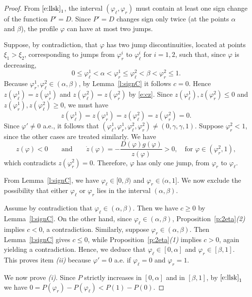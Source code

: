 \documentclass[11pt,a4paper]{article}
\renewcommand{\phi}{\varphi}
\begin{document}
\begin{proof}
From $\eqref{e:llsk}_1$, the interval $(\phi_\ell, \phi_r)$ must contain at least one sign change of the function $P' = D$. Since $P' = D$ changes sign only twice (at the points $\alpha$ and $\beta$), the profile $\phi$ can have at most two jumps.

Suppose, by contradiction, that $\phi$ has two jump discontinuities, located at points $\xi_1>\xi_2$, corresponding to jumps from $\phi_r^{i}$ to $\phi_\ell^{i}$ for $i=1,2$, such that, since $\phi$ is decreasing,
\begin{equation*}
\label{e:two_jumps}
0 \le \phi_\ell^{1} < \alpha < \phi_r^{1} \le \phi_\ell^{2} < \beta < \phi_r^{2} \le 1.
\end{equation*}
Because $\phi_r^{1}, \phi_\ell^{2} \in (\alpha, \beta)$, by Lemma~\ref{l:signC} it follows $c = 0$. Hence $z(\varphi_\ell^1) = z(\varphi_r^1)$ and $z(\varphi_\ell^2) = z(\varphi_r^2)$ by \eqref{e:cz}. Since $z(\varphi_\ell^1), z(\varphi_r^2) \le 0$ and $z(\varphi_r^1), z(\varphi_\ell^2) \ge 0$, we must have
\[
z(\varphi_\ell^1) = z(\varphi_r^1) = z(\varphi_\ell^2) = z(\varphi_r^2) = 0.
\]
%
Since $\phi'\ne0$ a.e., it follows that $(\phi_\ell^1,\phi_r^1,\phi_\ell^2,\phi_r^2) \neq (0,\gamma,\gamma,1)$. Suppose $\phi_r^2 < 1$, since the other cases are treated similarly. We have
\[
z(\phi) < 0 
\qquad \text{and} \qquad 
\dot z(\phi) = -\frac{D(\phi) g(\phi)}{z(\phi)} > 0, 
\quad \text{for } \phi \in (\phi_r^2, 1),
\]
which contradicts $z(\phi_r^2) = 0$. Therefore, $\phi$ has only one jump, from $\varphi_r$ to $\varphi_\ell$.

From Lemma~\ref{l:signC}, we have $\phi_\ell \in [0, \beta)$ and $\phi_r \in (\alpha, 1]$. We now exclude the possibility that either $\phi_\ell$ or $\phi_r$ lies in the interval $(\alpha, \beta)$.

Assume by contradiction that $\phi_\ell \in (\alpha, \beta)$. Then we have $c \ge 0$ by Lemma~\ref{l:signC}. On the other hand, since $\phi_\ell \in (\alpha, \beta)$, Proposition~\ref{p:2eta}\textit{(2)} implies $c < 0$, a contradiction.
Similarly, suppose $\phi_r \in (\alpha, \beta)$. Then Lemma~\ref{l:signC} gives $c \le 0$, while Proposition~\ref{p:2eta}\textit{(1)} implies $c > 0$, again yielding a contradiction.
Hence, we deduce that $\phi_\ell \in [0, \alpha]$ and $\phi_r \in [\beta, 1]$. This proves item \emph{(ii)} because $\varphi'=0$ a.e. if $\varphi_\ell = 0$ and $\varphi_r = 1$.

We now prove {\em (i)}. Since $P$ strictly increases in $[0,\alpha]$ and in $[\beta,1]$, by $\eqref{e:llsk}_1$ we have
$0=P(\phi_r) - P(\phi_\ell) < P(1) - P(0)$.
\end{proof}
\end{document}

